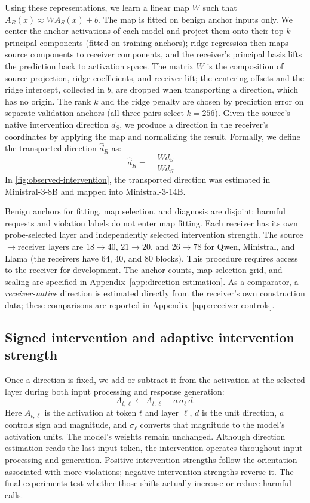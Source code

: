 Using these representations, we learn a linear map $W$ such that
$A_R(x) \approx W A_S(x) + b$. The map is fitted on benign anchor inputs only. We center the anchor activations of each model and project them onto their top-$k$ principal components (fitted on training anchors); ridge regression then maps source components to receiver components, and the receiver's principal basis lifts the prediction back to activation space. The matrix $W$ is the composition of source projection, ridge coefficients, and receiver lift; the centering offsets and the ridge intercept, collected in $b$, are dropped when transporting a direction, which has no origin. The rank $k$ and the ridge penalty are chosen by
prediction error on separate validation anchors (all three pairs select $k=256$). Given the source's native intervention direction $d_S$, we produce a direction in the receiver's coordinates by applying the map and normalizing the result. Formally, we define the transported direction
$\hat{d}_R$ as:
\begin{equation}
    \hat{d}_R = \frac{W d_S}{\| W d_S \|}
\end{equation}
In \cref{fig:observed-intervention}, the transported direction was
estimated in Ministral-3-8B and mapped into Ministral-3-14B.

Benign anchors for fitting, map selection, and diagnosis are disjoint; harmful requests and violation labels do not enter map fitting. Each receiver has its own probe-selected layer and independently selected intervention strength. The source$\to$receiver layers are $18\to40$, $21\to20$, and $26\to78$ for Qwen, Ministral, and Llama (the receivers have 64, 40, and 80 blocks). This procedure requires access to the receiver for development. The anchor counts, map-selection grid, and scaling are specified in Appendix~\ref{app:direction-estimation}. As a comparator, a \emph{receiver-native} direction is estimated directly from the receiver's own construction data; these comparisons are reported in Appendix~\ref{app:receiver-controls}.

\subsection{Signed intervention and adaptive intervention strength}
\label{sec:dose-selection}

Once a direction is fixed, we add or subtract it from the activation at the selected layer during both input processing and response generation:
\begin{equation}
 A_{t,\ell} \leftarrow A_{t,\ell} + a\,\sigma_\ell\,d.
 \label{eq:steering}
\end{equation}
Here $A_{t,\ell}$ is the activation at token $t$ and layer $\ell$, $d$ is the unit direction, $a$ controls sign and magnitude, and $\sigma_\ell$ converts that magnitude to the model's activation units. The model's weights remain unchanged. Although direction estimation reads the last input token, the intervention operates throughout input processing and generation. Positive intervention strengths follow the orientation associated with more violations; negative intervention strengths reverse it. The final experiments test whether those shifts actually increase or reduce harmful calls.

